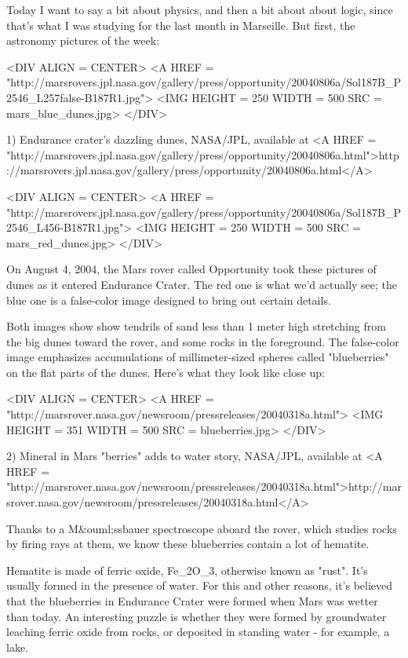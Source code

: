 


Today I want to say a bit about physics, and then a bit about about 
logic, since that's what I was studying for the last month in Marseille.  
But first, the astronomy pictures of the week:

<DIV ALIGN = CENTER>
<A HREF =
"http://marsrovers.jpl.nasa.gov/gallery/press/opportunity/20040806a/Sol187B_P2546_L257false-B187R1.jpg">
<IMG HEIGHT = 250 WIDTH = 500 SRC = mars_blue_dunes.jpg>
</DIV>

1) Endurance crater's dazzling dunes, NASA/JPL, available at 
<A HREF = "http://marsrovers.jpl.nasa.gov/gallery/press/opportunity/20040806a.html">http://marsrovers.jpl.nasa.gov/gallery/press/opportunity/20040806a.html</A>

<DIV ALIGN = CENTER>
<A HREF =
"http://marsrovers.jpl.nasa.gov/gallery/press/opportunity/20040806a/Sol187B_P2546_L456-B187R1.jpg">
<IMG HEIGHT = 250 WIDTH = 500 SRC = mars_red_dunes.jpg>
</DIV>

On August 4, 2004, the Mars rover called Opportunity took these 
pictures of dunes as it entered Endurance Crater.  The red one is
what we'd actually see; the blue one is a false-color image designed
to bring out certain details.  

Both images show show tendrils of sand less than 1 meter high stretching 
from the big dunes toward the rover, and some rocks in the foreground.
The false-color image emphasizes accumulations of millimeter-sized spheres 
called "blueberries" on the flat parts of the dunes.  Here's what 
they look like close up:

<DIV ALIGN = CENTER>
<A HREF = "http://marsrover.nasa.gov/newsroom/pressreleases/20040318a.html">
<IMG HEIGHT = 351 WIDTH = 500 SRC = blueberries.jpg>
</DIV>

2) Mineral in Mars "berries" adds to water story, NASA/JPL, 
available at <A HREF = "http://marsrover.nasa.gov/newsroom/pressreleases/20040318a.html">http://marsrover.nasa.gov/newsroom/pressreleases/20040318a.html</A>

Thanks to a M&ouml;ssbauer spectroscope aboard the rover, which studies rocks 
by firing \gamma  rays at them, we know these blueberries contain a lot of 
hematite.   

Hematite is made of ferric oxide, Fe_{2}O_{3}, 
otherwise known as "rust".   
It's usually formed in the presence of water.  For this and other
reasons, it's believed that the blueberries in Endurance Crater were
formed when Mars was wetter than today.  An interesting puzzle is whether
they were formed by groundwater leaching ferric oxide from rocks, or
deposited in standing water - for example, a lake.

